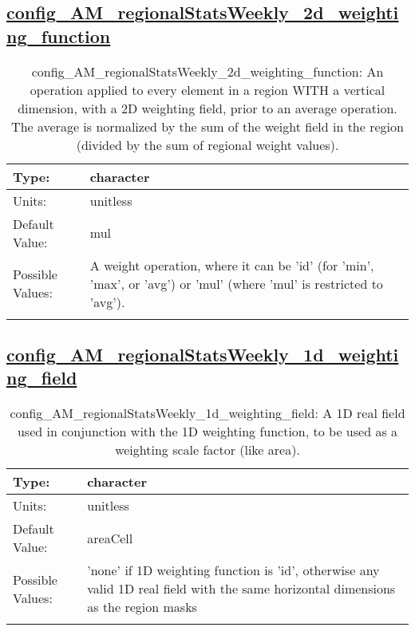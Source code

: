\subsection[config\_AM\_regionalStatsWeekly\_2d\_weighting\_function]{\hyperref[sec:nm_tab_AM_regionalStatsWeekly]{config\_AM\_regionalStatsWeekly\_2d\_weighting\_function}}
\label{subsec:nm_sec_config_AM_regionalStatsWeekly_2d_weighting_function}
\begin{center}
\begin{longtable}{| p{2.0in} || p{4.0in} |}
    \hline
    Type: & character \\
    \hline
    Units: & \si{unitless} \\
    \hline
    Default Value: & mul \\
    \hline
    Possible Values: & A weight operation, where it can be 'id' (for 'min', 'max', or 'avg') or 'mul' (where 'mul' is restricted to 'avg'). \\
    \hline
    \caption{config\_AM\_regionalStatsWeekly\_2d\_weighting\_function: An operation applied to every element in a region WITH a vertical dimension, with a 2D weighting field, prior to an average operation. The average is normalized by the sum of the weight field in the region (divided by the sum of regional weight values).}
\end{longtable}
\end{center}
\subsection[config\_AM\_regionalStatsWeekly\_1d\_weighting\_field]{\hyperref[sec:nm_tab_AM_regionalStatsWeekly]{config\_AM\_regionalStatsWeekly\_1d\_weighting\_field}}
\label{subsec:nm_sec_config_AM_regionalStatsWeekly_1d_weighting_field}
\begin{center}
\begin{longtable}{| p{2.0in} || p{4.0in} |}
    \hline
    Type: & character \\
    \hline
    Units: & \si{unitless} \\
    \hline
    Default Value: & areaCell \\
    \hline
    Possible Values: & 'none' if 1D weighting function is 'id', otherwise any valid 1D real field with the same horizontal dimensions as the region masks \\
    \hline
    \caption{config\_AM\_regionalStatsWeekly\_1d\_weighting\_field: A 1D real field used in conjunction with the 1D weighting function, to be used as a weighting scale factor (like area).}
\end{longtable}
\end{center}

